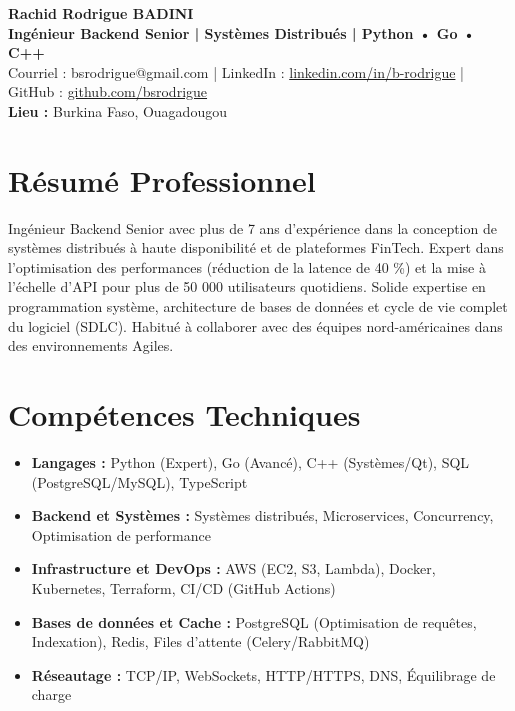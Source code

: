 \documentclass[a4paper,10pt]{article}
\begin{document}
\begin{center}
    {\LARGE\bfseries Rachid Rodrigue BADINI} \\[0.15cm]
    \textbf{Ingénieur Backend Senior | Systèmes Distribués | Python • Go • C++} \\
    Courriel : bsrodrigue@gmail.com | LinkedIn : \href{https://linkedin.com/in/b-rodrigue}{linkedin.com/in/b-rodrigue} | GitHub : \href{https://github.com/bsrodrigue}{github.com/bsrodrigue} \\
    \textbf{Lieu :} Burkina Faso, Ouagadougou
\end{center}

\vspace{0.1cm}

\section*{Résumé Professionnel}
Ingénieur Backend Senior avec plus de 7 ans d'expérience dans la conception de systèmes distribués à haute disponibilité et de plateformes FinTech. Expert dans l'optimisation des performances (réduction de la latence de 40 \%) et la mise à l'échelle d'API pour plus de 50 000 utilisateurs quotidiens. Solide expertise en programmation système, architecture de bases de données et cycle de vie complet du logiciel (SDLC). Habitué à collaborer avec des équipes nord-américaines dans des environnements Agiles.

\section*{Compétences Techniques}
\begin{itemize}[leftmargin=*,nosep]
    \item \textbf{Langages :} Python (Expert), Go (Avancé), C++ (Systèmes/Qt), SQL (PostgreSQL/MySQL), TypeScript
    \item \textbf{Backend et Systèmes :} Systèmes distribués, Microservices, Concurrency, Optimisation de performance
    \item \textbf{Infrastructure et DevOps :} AWS (EC2, S3, Lambda), Docker, Kubernetes, Terraform, CI/CD (GitHub Actions)
    \item \textbf{Bases de données et Cache :} PostgreSQL (Optimisation de requêtes, Indexation), Redis, Files d'attente (Celery/RabbitMQ)
    \item \textbf{Réseautage :} TCP/IP, WebSockets, HTTP/HTTPS, DNS, Équilibrage de charge
\end{itemize}
\end{document}
